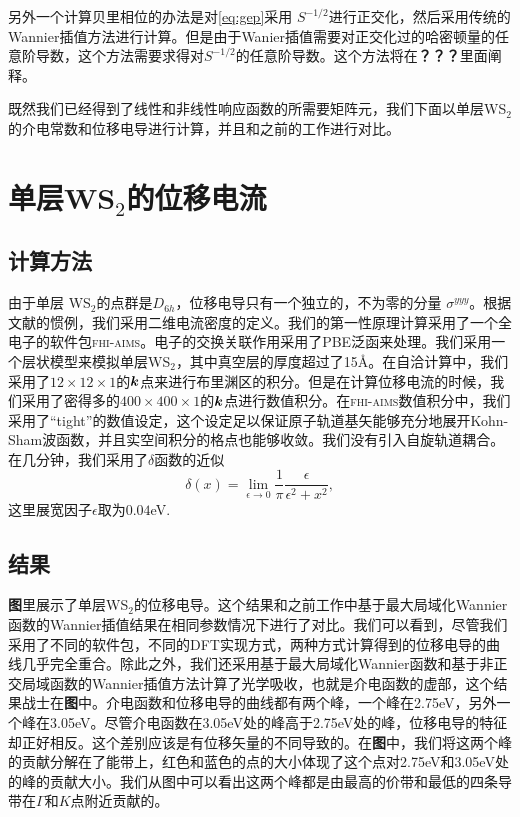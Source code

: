 另外一个计算贝里相位的办法是对\ref{eq:gep}采用 $S^{-1/2}$进行正交化，然后采用传统的Wannier插值方法进行计算。但是由于Wanier插值需要对正交化过的哈密顿量的任意阶导数，这个方法需要求得对$S^{-1/2}$的任意阶导数。这个方法将在\textbf{？？？}里面阐释。

既然我们已经得到了线性和非线性响应函数的所需要矩阵元，我们下面以单层WS$_2$的介电常数和位移电导进行计算，并且和之前的工作进行对比。

\section{单层WS$_2$的位移电流}

\subsection{计算方法}

由于单层 WS$_2$的点群是$D_{6h}$，位移电导只有一个独立的，不为零的分量 $\sigma^{yyy}$\cite{bilbao,wang_first-principles_2017}。根据文献的惯例，我们采用二维电流密度的定义。我们的第一性原理计算采用了一个全电子的软件包\textsc{fhi-aims}。电子的交换关联作用采用了PBE泛函\cite{perdew_generalized_1996}来处理。我们采用一个层状模型来模拟单层WS$_2$，其中真空层的厚度超过了15\AA。在自洽计算中，我们采用了$12\times12\times1$的$\boldsymbol{k}$点来进行布里渊区的积分。但是在计算位移电流的时候，我们采用了密得多的$400\times400\times1$的$\boldsymbol{k}$点进行数值积分。在\textsc{fhi-aims}数值积分中，我们采用了“tight”的数值设定，这个设定足以保证原子轨道基矢能够充分地展开Kohn-Sham波函数，并且实空间积分的格点也能够收敛\cite{blum_ab_2009}。我们没有引入自旋轨道耦合。在几分钟，我们采用了$\delta$函数的近似
\[
\delta(x)=\lim_{\epsilon\to0}\frac{1}{\pi}\frac{\epsilon}{\epsilon^2+x^2},
\]
这里展宽因子$\epsilon$取为$0.04$eV.


\subsection{结果}

\textbf{图}里展示了单层WS$_2$的位移电导。这个结果和之前工作中基于最大局域化Wannier函数的Wannier插值结果在相同参数情况下进行了对比。我们可以看到，尽管我们采用了不同的软件包，不同的DFT实现方式，两种方式计算得到的位移电导的曲线几乎完全重合。除此之外，我们还采用基于最大局域化Wannier函数和基于非正交局域函数的Wannier插值方法计算了光学吸收，也就是介电函数的虚部，这个结果战士在\textbf{图}中。介电函数和位移电导的曲线都有两个峰，一个峰在2.75eV，另外一个峰在3.05eV。尽管介电函数在3.05eV处的峰高于2.75eV处的峰，位移电导的特征却正好相反。这个差别应该是有位移矢量的不同导致的。在\textbf{图}中，我们将这两个峰的贡献分解在了能带上，红色和蓝色的点的大小体现了这个点对2.75eV和3.05eV处的峰的贡献大小。我们从图中可以看出这两个峰都是由最高的价带和最低的四条导带在$\Gamma$和$K$点附近贡献的。


